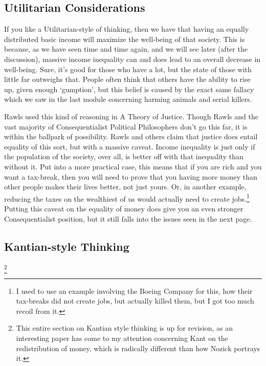 \subsection{Utilitarian Considerations}

If you like a Utilitarian-style of thinking, then we have that having an equally distributed basic income will maximize the well-being of that society. This is because, as we have seen time and time again, and we will see later (after the discussion), massive income inequality can and does lead to an overall decrease in well-being. Sure, it's good for those who have a lot, but the state of those with little far outweighs that. People often think that others have the ability to rise up, given enough `gumption', but this belief is caused by the exact same fallacy which we saw in the last module concerning harming animals and serial killers. 

Rawls used this kind of reasoning in A Theory of Justice. Though Rawls and the vast majority of Consequentialist Political Philosophers don't go this far, it is within the ballpark of possibility. Rawls and others claim that justice does entail equality of this sort, but with a massive caveat. Income inequality is just only if the population of the society, over all, is better off with that inequality than without it. Put into a more practical case, this means that if you are rich and you want a tax-break, then you will need to prove that you having more money than other people makes their lives better, not just yours. Or, in another example, reducing the taxes on the wealthiest of us would actually need to create jobs.\footnote{I used to use an example involving the Boeing Company for this, how their tax-breaks did not create jobs, but actually killed them, but I got too much recoil from it.} Putting this caveat on the equality of money does give you an even stronger Consequentialist position, but it still falls into the issues seen in the next page.
\subsection{Kantian-style Thinking}\footnote{This entire section on Kantian style thinking is up for revision, as an interesting paper has come to my attention concerning Kant on the redistribution of money, which is radically different than how Nozick portrays it.}

